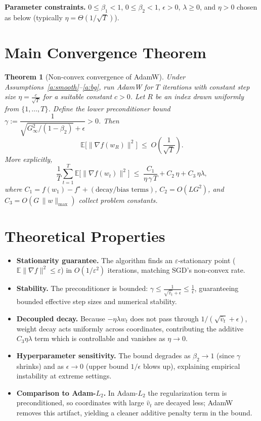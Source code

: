 \documentclass[11pt]{article}
\newtheorem{theorem}{Theorem}
\begin{document}
\noindent\textbf{Parameter constraints.}
$0\le\beta_1<1$, $0\le\beta_2<1$, $\epsilon>0$, $\lambda\ge 0$, and
$\eta>0$ chosen as below (typically $\eta=\Theta(1/\sqrt{T})$).

\section*{Main Convergence Theorem}
\begin{theorem}[Non-convex convergence of AdamW]\label{thm:main}
Under Assumptions~\ref{a:smooth}--\ref{a:bg}, run AdamW for $T$ iterations with
constant step size $\eta = \frac{c}{\sqrt{T}}$ for a suitable constant $c>0$.
Let $R$ be an index drawn uniformly from $\{1,\dots,T\}$. Define the lower
preconditioner bound $\gamma := \dfrac{1}{\sqrt{G_\infty^2/(1-\beta_2)}+\epsilon}>0$.
Then
\[
\mathbb{E}\big[\|\nabla f(w_R)\|^2\big]
\;\le\;
O\!\left(\frac{1}{\sqrt{T}}\right).
\]
More explicitly,
\[
\frac{1}{T}\sum_{t=1}^{T}\mathbb{E}\big[\|\nabla f(w_t)\|^2\big]
\;\le\;
\frac{C_1}{\eta\,\gamma\,T} + C_2\,\eta + C_3\,\eta\lambda,
\]
where $C_1=f(w_1)-f^\star + (\text{decay/bias terms})$, $C_2=O(L G^2)$, and
$C_3 = O(G\,\|w\|_{\max})$ collect problem constants.
\end{theorem}

\section*{Theoretical Properties}
\begin{itemize}
\item \textbf{Stationarity guarantee.} The algorithm finds an
$\varepsilon$-stationary point ($\mathbb{E}\|\nabla f\|^2 \le \varepsilon$)
in $O(1/\varepsilon^2)$ iterations, matching SGD's non-convex rate.
\item \textbf{Stability.} The preconditioner is bounded:
$\gamma \le \frac{1}{\sqrt{\hat v_t}+\epsilon} \le \frac{1}{\epsilon}$,
guaranteeing bounded effective step sizes and numerical stability.
\item \textbf{Decoupled decay.} Because $-\eta\lambda w_t$ does not pass through
$1/(\sqrt{\hat v_t}+\epsilon)$, weight decay acts uniformly across coordinates,
contributing the additive $C_3\eta\lambda$ term which is controllable and vanishes
as $\eta\to 0$.
\item \textbf{Hyperparameter sensitivity.} The bound degrades as $\beta_2\to 1$
(since $\gamma$ shrinks) and as $\epsilon\to 0$ (upper bound $1/\epsilon$ blows up),
explaining empirical instability at extreme settings.
\item \textbf{Comparison to Adam-$L_2$.} In Adam-$L_2$ the regularization term is
preconditioned, so coordinates with large $\hat v_t$ are decayed less; AdamW removes
this artifact, yielding a cleaner additive penalty term in the bound.
\end{itemize}
\end{document}
